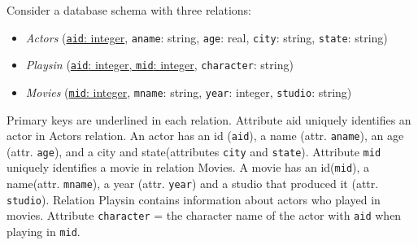 \documentclass[letterpaper, 11pt]{article}
\begin{document}
Consider a database schema with three relations:
\begin{itemize}
    \item \textit{Actors} (\underline{\texttt{aid}: integer}, \texttt{aname}: string, \texttt{age}: real, \texttt{city}: string, \texttt{state}: string)
    \item \textit{Playsin} (\underline{\texttt{aid}: integer, \texttt{mid}: integer}, \texttt{character}: string)
    \item \textit{Movies} (\underline{\texttt{mid}: integer}, \texttt{mname}: string, \texttt{year}: integer, \texttt{studio}: string)
\end{itemize}

Primary keys are underlined in each relation. Attribute aid uniquely identifies an actor in Actors relation. An actor has an id (\texttt{aid}), a name (attr. \texttt{aname}), an age (attr. \texttt{age}), and a city and state(attributes \texttt{city} and \texttt{state}). Attribute \texttt{mid} uniquely identifies a movie in relation Movies. A movie has an id(\texttt{mid}), a name(attr. \texttt{mname}), a year (attr. \texttt{year}) and a studio that produced it (attr. \texttt{studio}). Relation Playsin contains information about actors who played in movies. Attribute \texttt{character} = the character name of the actor with \texttt{aid} when playing in \texttt{mid}.
\end{document}

